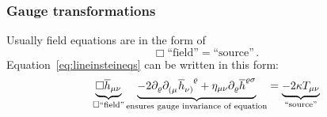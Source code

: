\subsubsection{Gauge transformations}
Usually field equations are in the form of
\begin{equation}
    \Box \text{``field''} = \text{``source''}\,.
\end{equation}
Equation~\eqref{eq:lineinsteineqs} can be written in this form:
\begin{equation}
    \underbrace{\Box \overline{h}_{\mu\nu}}_{\Box\text{``field''}}
    \underbrace{- 2 \partial_\varrho \tensor{\partial}{_(_\mu} \tensor{\overline{h}}{_\nu_)^\varrho}
    + \eta_{\mu\nu}\partial_\varrho \overline{h}^{\varrho\sigma}}_{\text{ensures gauge invariance of equation}}
    = \underbrace{-2\kappa T_{\mu\nu}}_{\text{``source''}}
\end{equation}


